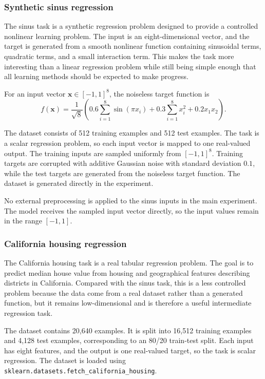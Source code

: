 \subsubsection{Synthetic sinus regression}

The sinus task is a synthetic regression problem designed to provide a controlled nonlinear learning problem. The input is an eight-dimensional vector, and the target is generated from a smooth nonlinear function containing sinusoidal terms, quadratic terms, and a small interaction term. This makes the task more interesting than a linear regression problem while still being simple enough that all learning methods should be expected to make progress.

For an input vector \(\mathbf{x}\in[-1,1]^8\), the noiseless target function is
\[
f(\mathbf{x})
=
\frac{1}{\sqrt{8}}
\left(
0.6\sum_{i=1}^{8}\sin(\pi x_i)
+0.3\sum_{i=1}^{8}x_i^2
+0.2x_1x_2
\right).
\]

The dataset consists of 512 training examples and 512 test examples. The task is a scalar regression problem, so each input vector is mapped to one real-valued output. The training inputs are sampled uniformly from \([-1,1]^8\). Training targets are corrupted with additive Gaussian noise with standard deviation \(0.1\), while the test targets are generated from the noiseless target function. The dataset is generated directly in the experiment.

No external preprocessing is applied to the sinus inputs in the main experiment. The model receives the sampled input vector directly, so the input values remain in the range \([-1,1]\).

\subsubsection{California housing regression}

The California housing task is a real tabular regression problem. The goal is to predict median house value from housing and geographical features describing districts in California. Compared with the sinus task, this is a less controlled problem because the data come from a real dataset rather than a generated function, but it remains low-dimensional and is therefore a useful intermediate regression task.

The dataset contains 20,640 examples. It is split into 16,512 training examples and 4,128 test examples, corresponding to an 80/20 train-test split. Each input has eight features, and the output is one real-valued target, so the task is scalar regression. The dataset is loaded using \texttt{sklearn.datasets.fetch\_california\_housing}.

